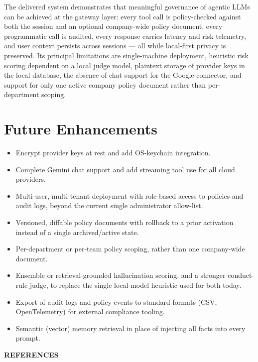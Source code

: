 \documentclass[12pt,a4paper,oneside]{report}
\begin{document}
The delivered system demonstrates that meaningful governance of
agentic LLMs can be achieved at the gateway layer: every tool call is
policy-checked against both the session and an optional company-wide
policy document, every programmatic call is audited, every response
carries latency and risk telemetry, and user context persists across
sessions --- all while local-first privacy is preserved. Its
principal limitations are single-machine deployment, heuristic risk
scoring dependent on a local judge model, plaintext storage of
provider keys in the local database, the absence of chat support for
the Google connector, and support for only one active company policy
document rather than per-department scoping.

\section{Future Enhancements}
\begin{itemize}
  \item Encrypt provider keys at rest and add OS-keychain
        integration.
  \item Complete Gemini chat support and add streaming tool use for
        all cloud providers.
  \item Multi-user, multi-tenant deployment with role-based access to
        policies and audit logs, beyond the current single
        administrator allow-list.
  \item Versioned, diffable policy documents with rollback to a prior
        activation instead of a single archived/active state.
  \item Per-department or per-team policy scoping, rather than one
        company-wide document.
  \item Ensemble or retrieval-grounded hallucination scoring, and a
        stronger conduct-rule judge, to replace the single local-model
        heuristic used for both today.
  \item Export of audit logs and policy events to standard formats
        (CSV, OpenTelemetry) for external compliance tooling.
  \item Semantic (vector) memory retrieval in place of injecting all
        facts into every prompt.
\end{itemize}

\clearpage
\begin{center}
{\fontsize{16}{19.2}\selectfont\bfseries REFERENCES}
\end{center}
\vspace{0.5cm}
\end{document}
